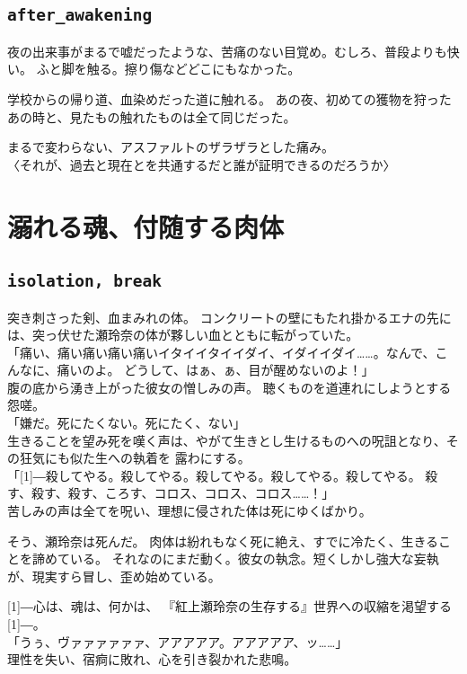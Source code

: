 \documentclass[autodetect-engine,dvipdfmx-if-dvi,a5paper,ja=standard,twoside,titlepage,final,twocolumn]{ltjtbook}
\begin{document}
\section{\tt \large after\_awakening}
夜の出来事がまるで嘘だったような、苦痛のない目覚め。むしろ、普段よりも快い。
ふと脚を触る。擦り傷などどこにもなかった。

学校からの帰り道、血染めだった道に触れる。
あの夜、初めての獲物を狩ったあの時と、見たもの触れたものは全て同じだった。

まるで変わらない、アスファルトのザラザラとした痛み。\\

〈それが、過去と現在とを共通するだと誰が証明できるのだろうか〉

\chapter{\rm 溺れる魂、付随する肉体}
\section{\tt \large isolation, break}
突き刺さった剣、血まみれの体。
コンクリートの壁にもたれ掛かるエナの先には、突っ伏せた瀬玲奈の体が夥しい血とともに転がっていた。\\
「痛い、痛い痛い痛い痛いイタイイタイイダイ、イダイイダイ……。なんで、こんなに、痛いのよ。
どうして、はぁ、ぁ、目が醒めないのよ！」\\
腹の底から湧き上がった彼女の憎しみの声。
聴くものを道連れにしようとする怨嗟。\\
「嫌だ。死にたくない。死にたく、ない」\\
生きることを望み死を嘆く声は、やがて生きとし生けるものへの呪詛となり、その狂気にも似た生への執着を
露わにする。\\
「\scalebox{3}[1]{―}殺してやる。殺してやる。殺してやる。殺してやる。殺してやる。
殺す、殺す、殺す、ころす、コロス、コロス、コロス……！」\\
苦しみの声は全てを呪い、理想に侵された体は死にゆくばかり。

そう、瀬玲奈は死んだ。
肉体は紛れもなく死に絶え、すでに冷たく、生きることを諦めている。
それなのにまだ動く。彼女の執念。短くしかし強大な妄執が、現実すら冒し、歪め始めている。

\scalebox{3}[1]{―}心は、魂は、何かは、
『紅上瀬玲奈の生存する』世界への収縮を渇望する\scalebox{3}[1]{―}。\\
「うぅ、ヴァァァァァァ、アアアアア。アアアアア、ッ……」\\
理性を失い、宿痾に敗れ、心を引き裂かれた悲鳴。
\end{document}
